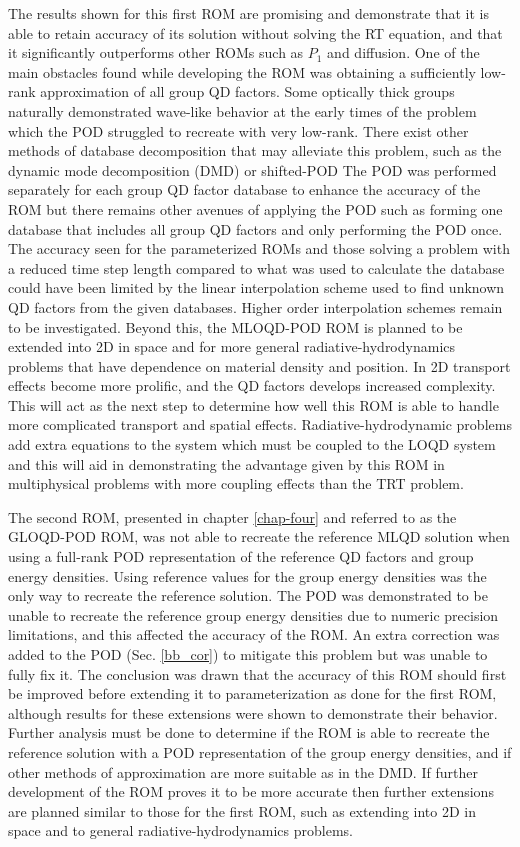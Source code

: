 \ind The results shown for this first ROM are promising and demonstrate that it is able to retain accuracy of its solution without solving the RT equation, and that it significantly outperforms other ROMs such as $P_1$ and diffusion. One of the main obstacles found while developing the ROM was obtaining a sufficiently low-rank approximation of all group QD factors. Some optically thick groups naturally demonstrated wave-like behavior at the early times of the problem which the POD struggled to recreate with very low-rank. There exist other methods of database decomposition that may alleviate this problem, such as the dynamic mode decomposition (DMD) \cite{schmid-2010,rgm-tsh-m&c2019} or shifted-POD \cite{reiss2-2018,reiss-2018} The POD was performed separately for each group QD factor database to enhance the accuracy of the ROM but there remains other avenues of applying the POD such as forming one database that includes all group QD factors and only performing the POD once. The accuracy seen for the parameterized ROMs and those solving a problem with a reduced time step length compared to what was used to calculate the database could have been limited by the linear interpolation scheme used to find unknown QD factors from the given databases. Higher order interpolation schemes remain to be investigated. Beyond this, the MLOQD-POD ROM is planned to be extended into 2D in space and for more general radiative-hydrodynamics problems that have dependence on material density and position. In 2D transport effects become more prolific, and the QD factors develops increased complexity. This will act as the next step to determine how well this ROM is able to handle more complicated transport and spatial effects. Radiative-hydrodynamic problems add extra equations to the system which must be coupled to the LOQD system and this will aid in demonstrating the advantage given by this ROM in multiphysical problems with more coupling effects than the TRT problem.

\ind The second ROM, presented in chapter \ref{chap-four} and referred to as the GLOQD-POD ROM, was not able to recreate the reference MLQD solution when using a full-rank POD representation of the reference QD factors and group energy densities. Using reference values for the group energy densities was the only way to recreate the reference solution. The POD was demonstrated to be unable to recreate the reference group energy densities due to numeric precision limitations, and this affected the accuracy of the ROM. An extra correction was added to the POD (Sec. \ref{bb_cor}) to mitigate this problem but was unable to fully fix it. The conclusion was drawn that the accuracy of this ROM should first be improved before extending it to parameterization as done for the first ROM, although results for these extensions were shown to demonstrate their behavior. Further analysis must be done to determine if the ROM is able to recreate the reference solution with a POD representation of the group energy densities, and if other methods of approximation are more suitable as in the DMD. If further development of the ROM proves it to be more accurate then further extensions are planned similar to those for the first ROM, such as extending into 2D in space and to general radiative-hydrodynamics problems.
